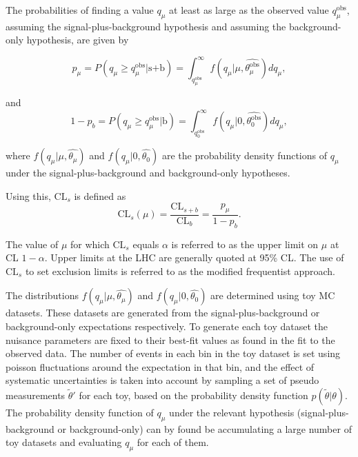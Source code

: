 The probabilities of finding a value $q_{\mu}$ at least as large as the observed value $q_{\mu}^{\text{obs}}$, assuming the signal-plus-background hypothesis
and assuming the background-only hypothesis, are given by

\begin{equation}\label{eqn:hhh_pvaluesig}
p_{\mu} = P(q_{\mu} \geq q_{\mu}^{\text{obs}} | \text{s+b}) = \int_{q_{\mu}^{\text{obs}}}^{\infty} f(q_{\mu} | \mu,\hat{\theta_{\mu}^{\text{obs}}}) dq_{\mu},
\end{equation}

and 
\begin{equation}\label{eqn:hhh_pvaluebkg}
1-p_b = P(q_{\mu} \geq q_{\mu}^{\text{obs}} | \text{b}) = \int_{q_{0}^{\text{obs}}}^{\infty} f(q_{\mu} | 0,\hat{\theta_{0}^{\text{obs}}}) dq_{\mu} ,
\end{equation}

where $f(q_{\mu}|\mu,\hat{\theta_{\mu}})$ and $f(q_{\mu} | 0,\hat{\theta_0})$ are the probability density functions of $q_{\mu}$ under
the signal-plus-background and background-only hypotheses.

Using this, $\text{CL}_s$ is defined as
\begin{equation}\label{eqn:hhh_cls}
\text{CL}_s(\mu) = \frac{\text{CL}_{s+b}}{\text{CL}_b} = \frac{p_{\mu}}{1-p_b}.
\end{equation}

The value of $\mu$ for which $\text{CL}_s$ equals $\alpha$ is referred to as the upper limit on $\mu$ at
\acf{CL} $1-\alpha$. Upper limits at the LHC are generally
quoted at 95\% \ac{CL}. %
The use of $\text{CL}_s$ to set exclusion limits is referred to as the modified frequentist approach\cite{CLS}.

The distributions $f(q_{\mu}|\mu,\hat{\theta_{\mu}})$ and $f(q_{\mu}|0,\hat{\theta_0})$ are determined
using toy MC datasets. These datasets are generated from the signal-plus-background or background-only expectations respectively. 
To generate each toy dataset the nuisance parameters are fixed to their best-fit values as found in the fit to the observed data.
The number of events in each bin in the toy dataset is set using poisson fluctuations around the expectation in that bin, and the effect of
systematic uncertainties is taken into account by sampling a set of pseudo measurements $\tilde{\theta}'$ for each toy, based on the 
probability density function $p(\tilde{\theta}|\theta)$.
The probability density function of $q_{\mu}$ under the relevant hypothesis (signal-plus-background or background-only)
can by found be accumulating a large number of toy datasets and evaluating $q_{\mu}$ for each of them.

